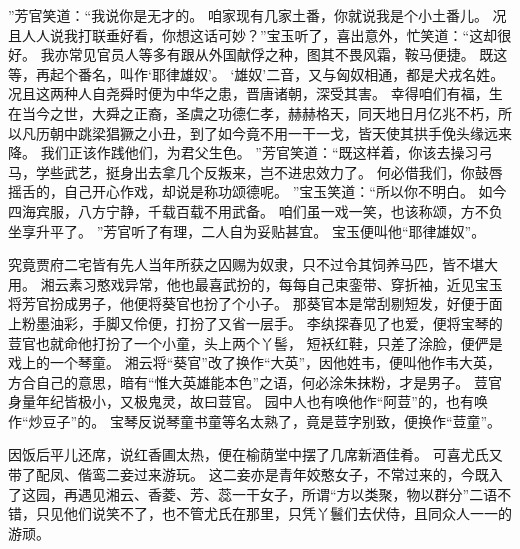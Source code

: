 ”芳官笑道：“我说你是无才的。
咱家现有几家土番，你就说我是个小土番儿。
况且人人说我打联垂好看，你想这话可妙？”宝玉听了，喜出意外，忙笑道：“这却很好。
我亦常见官员人等多有跟从外国献俘之种，图其不畏风霜，鞍马便捷。
既这等，再起个番名，叫作‘耶律雄奴’。
‘雄奴’二音，又与匈奴相通，都是犬戎名姓。
况且这两种人自尧舜时便为中华之患，晋唐诸朝，深受其害。
幸得咱们有福，生在当今之世，大舜之正裔，圣虞之功德仁孝，赫赫格天，同天地日月亿兆不朽，所以凡历朝中跳梁猖獗之小丑，到了如今竟不用一干一戈，皆天使其拱手俛头缘远来降。
我们正该作践他们，为君父生色。
”芳官笑道：“既这样着，你该去操习弓马，学些武艺，挺身出去拿几个反叛来，岂不进忠效力了。
何必借我们，你鼓唇摇舌的，自己开心作戏，却说是称功颂德呢。
”宝玉笑道：“所以你不明白。
如今四海宾服，八方宁静，千载百载不用武备。
咱们虽一戏一笑，也该称颂，方不负坐享升平了。
”芳官听了有理，二人自为妥贴甚宜。
宝玉便叫他“耶律雄奴”。
\par
究竟贾府二宅皆有先人当年所获之囚赐为奴隶，只不过令其饲养马匹，皆不堪大用。
湘云素习憨戏异常，他也最喜武扮的，每每自己束銮带、穿折袖，近见宝玉将芳官扮成男子，他便将葵官也扮了个小子。
那葵官本是常刮剔短发，好便于面上粉墨油彩，手脚又伶便，打扮了又省一层手。
李纨探春见了也爱，便将宝琴的荳官也就命他打扮了一个小童，头上两个丫髻，
短袄红鞋，只差了涂脸，便俨是戏上的一个琴童。
湘云将“葵官”改了换作“大英”，因他姓韦，便叫他作韦大英，方合自己的意思，暗有“惟大英雄能本色”之语，何必涂朱抹粉，才是男子。
荳官身量年纪皆极小，又极鬼灵，故曰荳官。
园中人也有唤他作“阿荳”的，也有唤作“炒豆子”的。
宝琴反说琴童书童等名太熟了，竟是荳字别致，便换作“荳童”。
\par
因饭后平儿还席，说红香圃太热，便在榆荫堂中摆了几席新酒佳肴。
可喜尤氏又带了配凤、偕鸾二妾过来游玩。
这二妾亦是青年姣憨女子，不常过来的，今既入了这园，再遇见湘云、香菱、芳、蕊一干女子，所谓“方以类聚，物以群分”二语不错，只见他们说笑不了，也不管尤氏在那里，只凭丫鬟们去伏侍，且同众人一一的游顽。
